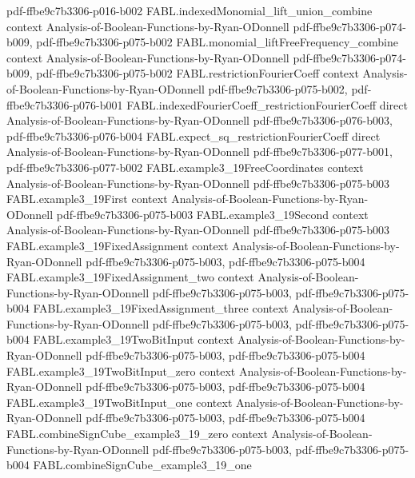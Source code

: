 \begin{theorem}
  {pdf-ffbe9c7b3306-p016-b002}
\proofstep
  {FABL.indexedMonomial_lift_union_combine}
  {context}
  {Analysis-of-Boolean-Functions-by-Ryan-ODonnell}
  {pdf-ffbe9c7b3306-p074-b009,
    pdf-ffbe9c7b3306-p075-b002}
\proofstep
  {FABL.monomial_liftFreeFrequency_combine}
  {context}
  {Analysis-of-Boolean-Functions-by-Ryan-ODonnell}
  {pdf-ffbe9c7b3306-p074-b009,
    pdf-ffbe9c7b3306-p075-b002}
\proofstep
  {FABL.restrictionFourierCoeff}
  {context}
  {Analysis-of-Boolean-Functions-by-Ryan-ODonnell}
  {pdf-ffbe9c7b3306-p075-b002,
    pdf-ffbe9c7b3306-p076-b001}
\proofstep
  {FABL.indexedFourierCoeff_restrictionFourierCoeff}
  {direct}
  {Analysis-of-Boolean-Functions-by-Ryan-ODonnell}
  {pdf-ffbe9c7b3306-p076-b003,
    pdf-ffbe9c7b3306-p076-b004}
\proofstep
  {FABL.expect_sq_restrictionFourierCoeff}
  {direct}
  {Analysis-of-Boolean-Functions-by-Ryan-ODonnell}
  {pdf-ffbe9c7b3306-p077-b001,
    pdf-ffbe9c7b3306-p077-b002}
\proofstep
  {FABL.example3_19FreeCoordinates}
  {context}
  {Analysis-of-Boolean-Functions-by-Ryan-ODonnell}
  {pdf-ffbe9c7b3306-p075-b003}
\proofstep
  {FABL.example3_19First}
  {context}
  {Analysis-of-Boolean-Functions-by-Ryan-ODonnell}
  {pdf-ffbe9c7b3306-p075-b003}
\proofstep
  {FABL.example3_19Second}
  {context}
  {Analysis-of-Boolean-Functions-by-Ryan-ODonnell}
  {pdf-ffbe9c7b3306-p075-b003}
\proofstep
  {FABL.example3_19FixedAssignment}
  {context}
  {Analysis-of-Boolean-Functions-by-Ryan-ODonnell}
  {pdf-ffbe9c7b3306-p075-b003,
    pdf-ffbe9c7b3306-p075-b004}
\proofstep
  {FABL.example3_19FixedAssignment_two}
  {context}
  {Analysis-of-Boolean-Functions-by-Ryan-ODonnell}
  {pdf-ffbe9c7b3306-p075-b003,
    pdf-ffbe9c7b3306-p075-b004}
\proofstep
  {FABL.example3_19FixedAssignment_three}
  {context}
  {Analysis-of-Boolean-Functions-by-Ryan-ODonnell}
  {pdf-ffbe9c7b3306-p075-b003,
    pdf-ffbe9c7b3306-p075-b004}
\proofstep
  {FABL.example3_19TwoBitInput}
  {context}
  {Analysis-of-Boolean-Functions-by-Ryan-ODonnell}
  {pdf-ffbe9c7b3306-p075-b003,
    pdf-ffbe9c7b3306-p075-b004}
\proofstep
  {FABL.example3_19TwoBitInput_zero}
  {context}
  {Analysis-of-Boolean-Functions-by-Ryan-ODonnell}
  {pdf-ffbe9c7b3306-p075-b003,
    pdf-ffbe9c7b3306-p075-b004}
\proofstep
  {FABL.example3_19TwoBitInput_one}
  {context}
  {Analysis-of-Boolean-Functions-by-Ryan-ODonnell}
  {pdf-ffbe9c7b3306-p075-b003,
    pdf-ffbe9c7b3306-p075-b004}
\proofstep
  {FABL.combineSignCube_example3_19_zero}
  {context}
  {Analysis-of-Boolean-Functions-by-Ryan-ODonnell}
  {pdf-ffbe9c7b3306-p075-b003,
    pdf-ffbe9c7b3306-p075-b004}
\proofstep
  {FABL.combineSignCube_example3_19_one}

\end{theorem}
